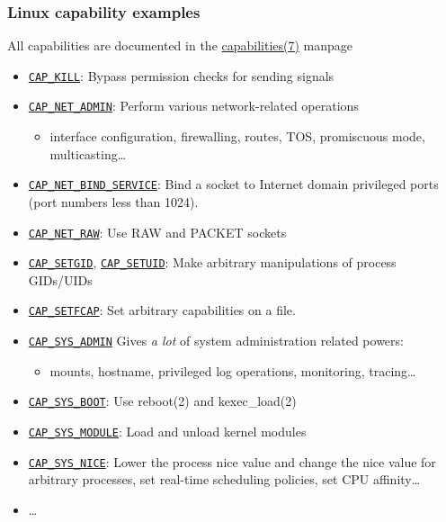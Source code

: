 \begin{frame}
	\frametitle{Linux capability examples}
	All capabilities are documented in the
	\href{https://manned.org/capabilities.7}{capabilities(7)} manpage
	\begin{itemize}
		\item
			\href{https://elixir.bootlin.com/linux/v6.19/source/include/uapi/linux/capability.h\#L148}{\texttt{CAP\_KILL}}:
			Bypass permission checks for sending signals
		\item
			\href{https://elixir.bootlin.com/linux/v6.19/source/include/uapi/linux/capability.h\#L205}{\texttt{CAP\_NET\_ADMIN}}:
			Perform various network-related operations
			\begin{itemize}
				\item interface configuration, firewalling, routes, TOS, promiscuous
					mode, multicasting\ldots
			\end{itemize}
		\item
			\href{https://elixir.bootlin.com/linux/v6.19/source/include/uapi/linux/capability.h\#L185}{\texttt{CAP\_NET\_BIND\_SERVICE}}:
			Bind a socket to Internet domain
			privileged ports (port numbers less than 1024).
		\item
			\href{https://elixir.bootlin.com/linux/v6.19/source/include/uapi/linux/capability.h\#L211}{\texttt{CAP\_NET\_RAW}}:
			Use RAW and PACKET sockets
		\item
			\href{https://elixir.bootlin.com/linux/v6.19/source/include/uapi/linux/capability.h\#L154}{\texttt{CAP\_SETGID}},
			\href{https://elixir.bootlin.com/linux/v6.19/source/include/uapi/linux/capability.h\#L159}{\texttt{CAP\_SETUID}}:
			Make arbitrary
			manipulations of process GIDs/UIDs
		\item
			\href{https://elixir.bootlin.com/linux/v6.19/source/include/uapi/linux/capability.h\#L343}{\texttt{CAP\_SETFCAP}}:
			Set arbitrary capabilities on a file.
		\item
			\href{https://elixir.bootlin.com/linux/v6.19/source/include/uapi/linux/capability.h\#L281}{\texttt{CAP\_SYS\_ADMIN}}
			Gives \emph{a lot} of system administration related powers:
			\begin{itemize}
				\item mounts, hostname, privileged log operations, monitoring,
					tracing\ldots
			\end{itemize}
		\item
			\href{https://elixir.bootlin.com/linux/v6.19/source/include/uapi/linux/capability.h\#L285}{\texttt{CAP\_SYS\_BOOT}}:
			Use reboot(2) and kexec\_load(2)
		\item
			\href{https://elixir.bootlin.com/linux/v6.19/source/include/uapi/linux/capability.h\#L224}{\texttt{CAP\_SYS\_MODULE}}:
			Load and unload kernel modules
		\item
			\href{https://elixir.bootlin.com/linux/v6.19/source/include/uapi/linux/capability.h\#L296}{\texttt{CAP\_SYS\_NICE}}:
			Lower the process nice value and change the
			nice value for arbitrary processes, set real-time scheduling policies, set
			CPU affinity\ldots
		\item \ldots
	\end{itemize}
\end{frame}

